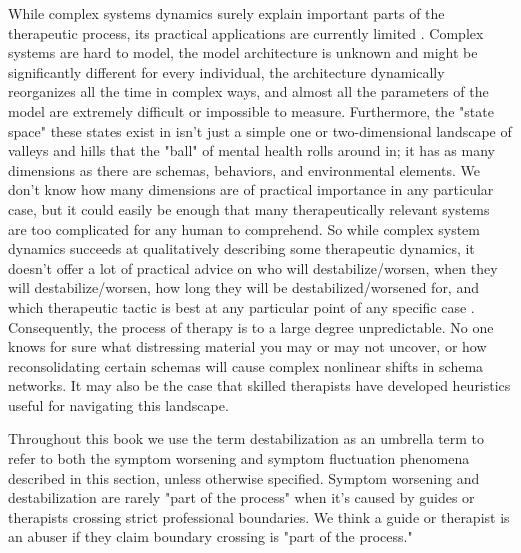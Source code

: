 \documentclass[12pt,letterpaper]{book}
\begin{document}
While complex systems dynamics surely explain important parts of the therapeutic process, its practical applications are currently limited \cite{hayes2020complex}. Complex systems are hard to model, the model architecture is unknown and might be significantly different for every individual, the architecture dynamically reorganizes all the time in complex ways, and almost all the parameters of the model are extremely difficult or impossible to measure. Furthermore, the "state space" these states exist in isn't just a simple one or two-dimensional landscape of valleys and hills that the "ball" of mental health rolls around in; it has as many dimensions as there are schemas, behaviors, and environmental elements. We don't know how many dimensions are of practical importance in any particular case, but it could easily be enough that many therapeutically relevant systems are too complicated for any human to comprehend. So while complex system dynamics succeeds at qualitatively describing some therapeutic dynamics, it doesn't offer a lot of practical advice on who will destabilize/worsen, when they will destabilize/worsen, how long they will be destabilized/worsened for, and which therapeutic tactic is best at any particular point of any specific case \cite{helmich2024slow,hayes2020complex}. Consequently, the process of therapy is to a large degree unpredictable. No one knows for sure what distressing material you may or may not uncover, or how reconsolidating certain schemas will cause complex nonlinear shifts in schema networks. It may also be the case that skilled therapists have developed heuristics useful for navigating this landscape.

Throughout this book we use the term destabilization as an umbrella term to refer to both the symptom worsening and symptom fluctuation phenomena described in this section, unless otherwise specified. Symptom worsening and destabilization are rarely "part of the process" when it's caused by guides or therapists crossing strict professional boundaries. We think a guide or therapist is an abuser if they claim boundary crossing is "part of the process."


\end{document}

